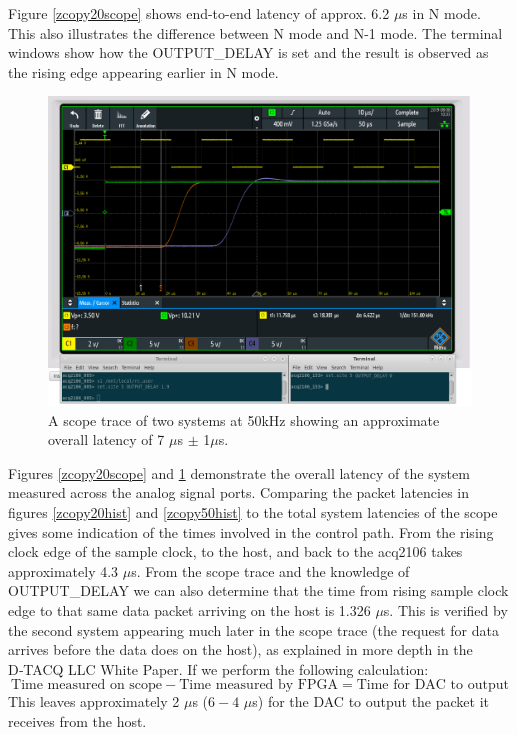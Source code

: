 \documentclass{article}
\begin{document}
Figure \ref{zcopy20scope} shows end-to-end latency of  approx. 6.2 $\mu$s in N mode. 
This also illustrates the difference between N mode and N-1 mode.
The terminal windows show how the OUTPUT\_DELAY is set and the result is observed as the rising edge appearing earlier in N mode.

\begin{figure}
	\centering
	\includegraphics[width=5.0in]{images/50kHz_annotated_scope_2.png}
	\caption{A scope trace of two systems at 50kHz showing an approximate overall latency of 7 $\mu$s $\pm$ 1$\mu$s.}
	\label{zcopy50scope}
\end{figure}

Figures \ref{zcopy20scope} and \ref{zcopy50scope} demonstrate the overall latency of the system measured across the analog signal ports.
Comparing the packet latencies in figures \ref{zcopy20hist} and \ref{zcopy50hist} to the total system latencies of the scope gives some indication of the times involved in the control path.
From the rising clock edge of the sample clock, to the host, and back to the acq2106 takes approximately 4.3 $\mu$s.
From the scope trace and the knowledge of OUTPUT\_DELAY we can also determine that the time from rising sample clock edge to that same data packet arriving on the host is 1.326 $\mu$s.
This is verified by the second system appearing much later in the scope trace (the request for data arrives before the data does on the host), as explained in more depth in the D‑TACQ  LLC White Paper.
If we perform the following calculation:
\begin{equation}
\text{Time measured on scope} - \text{Time measured by FPGA} = \text{Time for DAC to output}
\end{equation}
This leaves approximately 2 $\mu$s ($6-4$  $\mu$s) for the DAC to output the packet it receives from the host.
\end{document}
